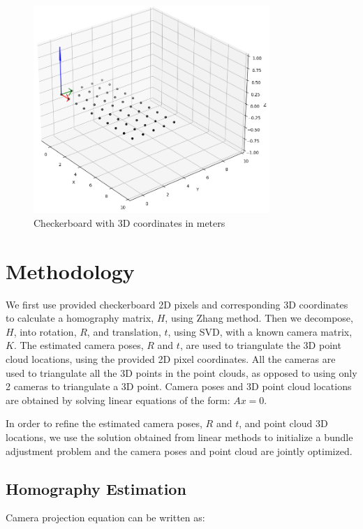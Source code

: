 \documentclass{article}
\begin{document}
\begin{figure}[h!]
    \centering
    \includegraphics[width=0.8\textwidth]{images/checkerboard.png}
    \caption{Checkerboard with 3D coordinates in meters}
    \label{fig:checkerboard}
\end{figure}


\section{Methodology}
We first use provided checkerboard 2D pixels and corresponding 3D coordinates to calculate a homography matrix, $H$, using Zhang method. Then we decompose, $H$, into rotation, $R$, and translation, $t$, using SVD,
with a known camera matrix, $K$. The estimated camera poses, $R$ and $t$, are used to triangulate the 3D point cloud locations, using the provided 2D pixel coordinates. All the cameras are used to triangulate all the 3D 
points in the point clouds, as opposed to using only 2 cameras to triangulate a 3D point. Camera poses and 3D point cloud locations are obtained by solving linear equations of the form: $Ax = 0$.

In order to refine the estimated camera poses, $R$ and $t$, and point cloud 3D locations, we use the solution obtained from linear methods to initialize a bundle adjustment problem and the camera poses and point cloud
are jointly optimized.

\pagebreak

\subsection{Homography Estimation}
Camera projection equation can be written as:
\end{document}

